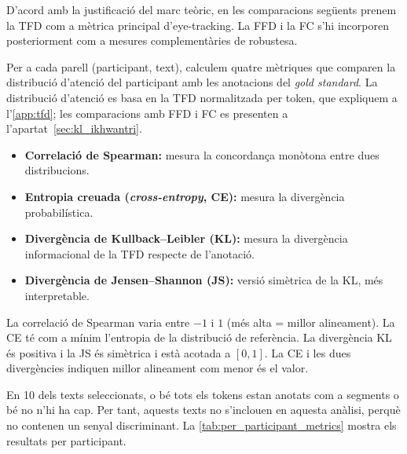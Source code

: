 
D'acord amb la justificació del marc teòric, en les comparacions següents prenem la TFD com a mètrica principal d'eye-tracking. La FFD i la FC s'hi incorporen posteriorment com a mesures complementàries de robustesa.

Per a cada parell (participant, text), calculem quatre mètriques que comparen la distribució d'atenció del participant amb les anotacions del \textit{gold standard}. La distribució d'atenció es basa en la TFD normalitzada per token, que expliquem a l'\autoref{app:tfd}; les comparacions amb FFD i FC es presenten a l'apartat~\ref{sec:kl_ikhwantri}.

\begin{itemize}
    \item \textbf{Correlació de Spearman:} mesura la concordança monòtona entre dues distribucions.
    \item \textbf{Entropia creuada (\textit{cross-entropy}, CE):} mesura la divergència probabilística.
    \item \textbf{Divergència de Kullback--Leibler (KL):} mesura la divergència informacional de la TFD respecte de l'anotació.
    \item \textbf{Divergència de Jensen--Shannon (JS):} versió simètrica de la KL, més interpretable.
\end{itemize}
La correlació de Spearman varia entre $-1$ i $1$ (més alta = millor alineament). 
La CE té com a mínim l'entropia de la distribució de referència. 
La divergència KL és positiva i la JS és simètrica i està acotada a $[0, 1]$.
La CE i les dues divergències indiquen millor alineament com menor és el valor.

En 10 dels texts seleccionats, o bé tots els tokens estan anotats com a segments o bé no n'hi ha cap.
Per tant, aquests texts no s'inclouen en aquesta anàlisi, perquè no contenen un senyal discriminant.
La \autoref{tab:per_participant_metrics} mostra els resultats per participant.

